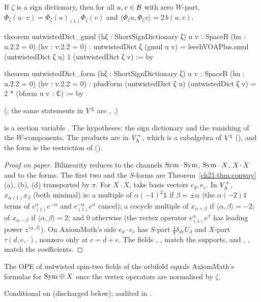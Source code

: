 \begin{theorem}\label{ch21:thm:untwisted}
If $\zeta$ is a sign dictionary, then for all $u,v\in\mathcal{B}$ with zero $W$-part,
$\Phi_\zeta(u\cdot v)=\Phi_\zeta(u)_{(1)}\Phi_\zeta(v)$ and $\langle\Phi_\zeta u,\Phi_\zeta v\rangle=2\,b(u,v)$.
\end{theorem}
\begin{leancode}
theorem untwistedDict_gmul (hζ : ShortSignDictionary ζ) {u v : SpaceB} (hu : u.2.2 = 0)
    (hv : v.2.2 = 0) :
    untwistedDict ζ (gmul u v) = leechVOAPlus.smul (untwistedDict ζ u) 1 (untwistedDict ζ v) := by
\end{leancode}
\begin{leancode}
theorem untwistedDict_form (hζ : ShortSignDictionary ζ) {u v : SpaceB} (hu : u.2.2 = 0)
    (hv : v.2.2 = 0) :
    plusForm (untwistedDict ζ u) (untwistedDict ζ v) = 2 * (bform u v : ℂ) := by
\end{leancode}
(; the same statements in ${V^{\natural}}$ are
, .)
\begin{dictionary}
 is a section variable .  The
hypotheses: the sign dictionary and the vanishing of the $W$-components.  The products are in
$V_{\Lambda}^+$, which is a subalgebra of ${V^{\natural}}$ (), and the form 
is the restriction of  ().
\end{dictionary}
\begin{proof}[Proof on paper]
Bilinearity reduces to the channels $\mathrm{Sym}\cdot\mathrm{Sym}$, $\mathrm{Sym}\cdot X$, $X\cdot X$ and to the forms.  The first two and
the $S$-forms are Theorem~\ref{ch21:thm:conway} (a), (b), (d) transported by $\pi$.  For $X\cdot X$, take
basis vectors $e_d,e_e$.  In $V_{\Lambda}^+$, $x_{\alpha}{}_{(1)}x_\beta$ (both minimal) is: a multiple of
$\alpha(-1)^2\mathbb1$ if $\beta=\pm\alpha$ (the $\alpha(-2)\mathbb1$ terms of
$e^\alpha_{(1)}e^{-\alpha}$ and $e^{-\alpha}_{(1)}e^{\alpha}$ cancel); a cocycle multiple of
$x_{\alpha+\beta}$ if $\langle\alpha,\beta\rangle=-2$; of $x_{\alpha-\beta}$ if $\langle\alpha,\beta\rangle=2$;
and $0$ otherwise (the vertex operator $e^\alpha_{(1)}e^\beta$ has leading power
$z^{\langle\alpha,\beta\rangle}$).  On AxiomMath's side $e_d\cdot e_e$ has $S$-part $\tfrac18\delta_{de}U_d$ and
$X$-part $\tau(d,e,\cdot)$, nonzero only at $c=d+e$.  The fields , ,
 match the supports, and , ,  match the
coefficients.
\end{proof}
\begin{physics}
The OPE of untwisted spin-two fields of the orbifold equals AxiomMath's formulas for $\mathrm{Sym}\oplus X$ once
the vertex operators are normalised by $\zeta$.
\end{physics}
\begin{status}
Conditional on  (discharged below); audited in
.
\end{status}

